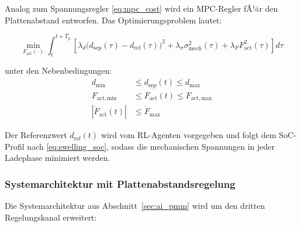 ﻿\documentclass[12pt,a4paper]{article}
\begin{document}
Analog zum Spannungsregler \eqref{eq:mpc_cost} wird ein MPC-Regler fÃ¼r
den Plattenabstand entworfen. Das Optimierungsproblem lautet:

\begin{equation}
	\min_{F_\mathrm{act}(\cdot)} \int_{t}^{t+T_p}
	\left[\lambda_d\bigl(d_\mathrm{sep}(\tau) - d_\mathrm{ref}(\tau)\bigr)^2
	+ \lambda_\sigma \sigma_\mathrm{mech}^2(\tau)
	+ \lambda_F F_\mathrm{act}^2(\tau)\right] d\tau
	\label{eq:mpc_plate_cost}
\end{equation}

unter den Nebenbedingungen:
\begin{align}
	d_\mathrm{min} &\leq d_\mathrm{sep}(t) \leq d_\mathrm{max} \label{eq:plate_constraint_d} \\
	F_\mathrm{act,min} &\leq F_\mathrm{act}(t) \leq F_\mathrm{act,max} \label{eq:plate_constraint_f} \\
	|\dot{F}_\mathrm{act}(t)| &\leq \dot{F}_\mathrm{max} \label{eq:plate_constraint_rate}
\end{align}

Der Referenzwert $d_\mathrm{ref}(t)$ wird vom RL-Agenten vorgegeben und folgt
dem SoC-Profil nach \eqref{eq:swelling_soc}, sodass die mechanischen Spannungen
in jeder Ladephase minimiert werden.

\subsubsection{Systemarchitektur mit Plattenabstandsregelung}

Die Systemarchitektur aus Abschnitt~\ref{sec:ai_pmm} wird um den dritten
Regelungskanal erweitert:
\end{document}
